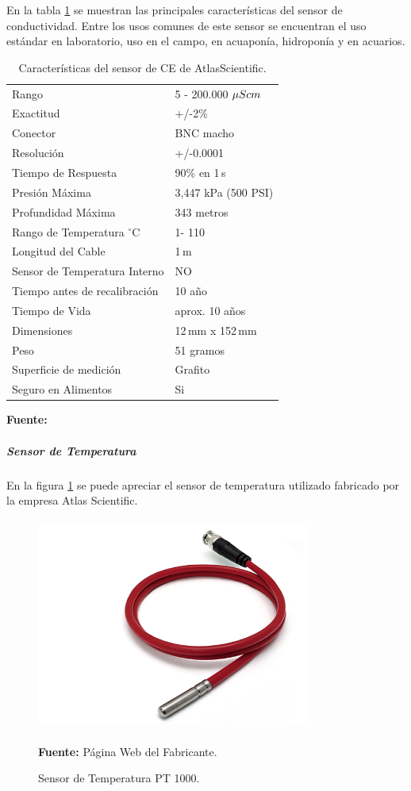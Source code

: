 En la tabla \ref{tab:caract_ce} se muestran las principales caracter\'isticas del sensor de conductividad.
Entre los usos comunes de este sensor se encuentran el uso est\'andar en laboratorio, uso en el campo, en acuapon\'ia, hidropon\'ia y en acuarios.
\begin{table}[H]
\protect\caption[Caracter\'isticas del sensor de CE de Atlas Scientific]{Caracter\'isticas del sensor de CE de AtlasScientific.}
\label{tab:caract_ce}
\begin{center}
\begin{tabular}{l l}
\hline
Rango    &  5 - 200.000 $\mu S\/cm$\\
Exactitud      &  +/-2\% \\
Conector &  BNC macho\\
Resolución   &  +/-0.0001\\
Tiempo de Respuesta   &  90\% en 1 s\\
Presión Máxima    &  3,447 kPa (500 PSI) \\
Profundidad Máxima	& 343 metros\\
Rango de Temperatura $^{\circ}$C	& 1- 110\\
Longitud del Cable	& 1 m\\
Sensor de Temperatura Interno	& NO\\
Tiempo antes de recalibraci\'on	& 10 año\\
Tiempo de Vida	& aprox. 10 años\\
Dimensiones	& 12 mm x 152 mm\\
Peso	& 51 gramos\\
Superficie de medición	& Grafito\\
Seguro en Alimentos	& Si\\
\hline
\end{tabular}
\vspace{5mm}
\newline
\hfill \textbf{Fuente:} \cite{atlasce}
\end{center}
\end{table}

\subparagraph{Sensor de Temperatura}
En la figura \ref{fig:4.15}  se puede apreciar el sensor de temperatura utilizado fabricado por la empresa Atlas Scientific.

\begin{figure}[ht]
    \centering
    \includegraphics[width=90mm, height=70mm]{Imagenes/2021/imag39.png}
    \caption[Sensor de Temperatura PT 1000]{Sensor de Temperatura PT 1000. }{\textbf{Fuente:} Página Web del Fabricante. }
    \label{fig:4.15}
\end{figure}

